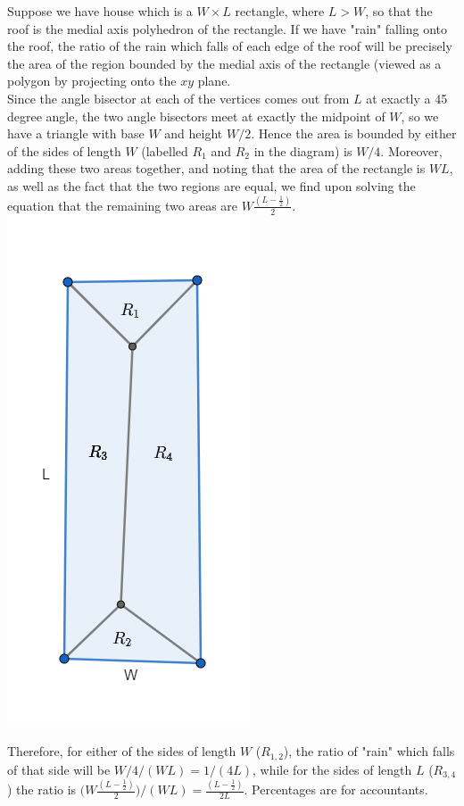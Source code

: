 \documentclass[12pt]{article}
\theoremstyle{definition}
\begin{document}
Suppose we have house which is a $W\times L$ rectangle, where $L> W$, so that the roof is the medial axis polyhedron of the rectangle. If we have "rain" falling onto the roof, the ratio of the rain which falls of each edge of the roof will be precisely the area of the region bounded by the medial axis of the rectangle (viewed as a polygon by projecting onto the $xy$ plane. \\
Since the angle bisector at each of the vertices comes out from $L$ at exactly a 45 degree angle, the two angle bisectors meet at exactly the midpoint of $W$, so we have a triangle with base $W$ and height $W/2$. Hence the area is bounded by either of the sides of length $W$ (labelled $R_1$ and $R_2$ in the diagram) is $W/4$. Moreover, adding these two areas together, and noting that the area of the rectangle is $WL$, as well as the fact that the two regions are equal, we find upon solving the equation that the remaining two areas are $W\frac{(L - \frac{1}{2})}{2}$. \\

\includegraphics[scale=0.4]{polygon_roof_base.png} 

Therefore, for either of the sides of length $W$ ($R_{1,2}$), the ratio of "rain" which falls of that side will be $ W/4 /(WL) = 1/(4L)$, while for the sides of length $L$ ($R_{3,4}$) the ratio is $ \big(W\frac{(L - \frac{1}{2})}{2}\big) /(WL) = \frac{(L - \frac{1}{2})}{2L}$. Percentages are for accountants.\\
\end{document}
